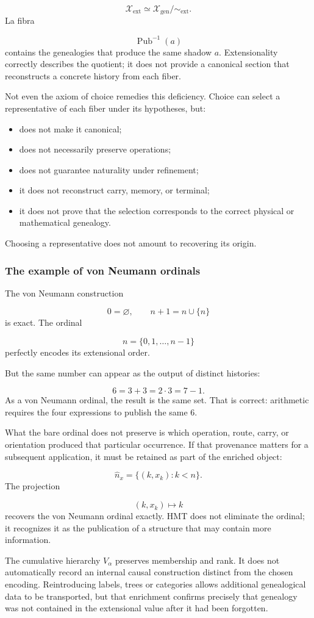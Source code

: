 \[
\mathscr X_{\mathrm{ext}}
\simeq
\mathscr X_{\mathrm{gen}}/
{\sim_{\mathrm{ext}}}.
\]
La fibra\par
\[
\operatorname{Pub}^{-1}(a)
\]
contains the genealogies that produce the same shadow \(a\). Extensionality correctly describes the quotient; it does not provide a canonical section that reconstructs a concrete history from each fiber.\par
Not even the axiom of choice remedies this deficiency. Choice can select a representative of each fiber under its hypotheses, but:\par
\begin{itemize}
\item does not make it canonical;
\item does not necessarily preserve operations;
\item does not guarantee naturality under refinement;
\item it does not reconstruct carry, memory, or terminal;
\item it does not prove that the selection corresponds to the correct physical or mathematical genealogy.
\end{itemize}
Choosing a representative does not amount to recovering its origin.\par
{}
\subsubsection{The example of von Neumann ordinals}
The von Neumann construction\par
\[
0=\varnothing,
\qquad
n+1=n\cup\{n\}
\]
is exact. The ordinal\par
\[
n=\{0,1,\ldots,n-1\}
\]
perfectly encodes its extensional order.\par
{}
But the same number can appear as the output of distinct histories:\par
\[
6=3+3=2\cdot3=7-1.
\]
As a von Neumann ordinal, the result is the same set. That is correct: arithmetic requires the four expressions to publish the same \(6\).\par
What the bare ordinal does not preserve is which operation, route, carry, or orientation produced that particular occurrence. If that provenance matters for a subsequent application, it must be retained as part of the enriched object:\par
\[
\widehat n_x
=
\{(k,x_k):k<n\}.
\]
The projection\par
\[
(k,x_k)\longmapsto k
\]
recovers the von Neumann ordinal exactly. HMT does not eliminate the ordinal; it recognizes it as the publication of a structure that may contain more information.\par
The cumulative hierarchy \(V_\alpha\) preserves membership and rank. It does not automatically record an internal causal construction distinct from the chosen encoding. Reintroducing labels, trees or categories allows additional genealogical data to be transported, but that enrichment confirms precisely that genealogy was not contained in the extensional value after it had been forgotten.\par
{}
